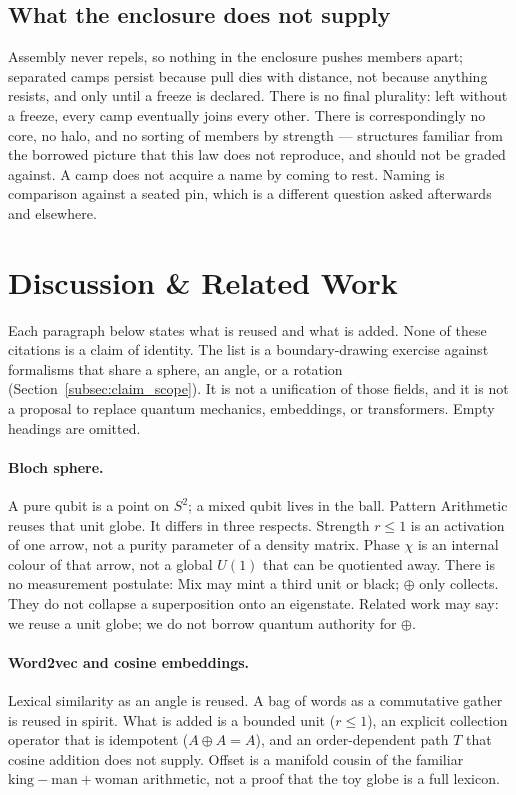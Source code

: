 \documentclass[12pt, a4paper]{article}
\begin{document}
\subsection{What the enclosure does not supply}
\label{subsec:enclosure_open}
Assembly never repels, so nothing in the enclosure pushes members
apart; separated camps persist because pull dies with distance, not
because anything resists, and only until a freeze is declared. There
is no final plurality: left without a freeze, every camp eventually
joins every other. There is correspondingly no core, no halo,
and no sorting of members by strength --- structures familiar from
the borrowed picture that this law does not reproduce, and should not
be graded against. A camp does not acquire a name by coming to rest.
Naming is comparison against a seated pin, which is a different
question asked afterwards and elsewhere.


\section{Discussion \& Related Work}
\label{sec:related}

Each paragraph below states what is reused and what is added. None of
these citations is a claim of identity. The list is a
boundary-drawing exercise against formalisms that share a sphere, an
angle, or a rotation
(Section~\ref{subsec:claim_scope}). It is not a unification of those
fields, and it is not a proposal to replace quantum mechanics,
embeddings, or transformers. Empty headings are omitted.

\paragraph{Bloch sphere.}
A pure qubit is a point on $S^2$; a mixed qubit lives in the ball.
Pattern Arithmetic reuses that unit globe. It differs in three
respects. Strength $r\le 1$ is an activation of one arrow, not a purity
parameter of a density matrix. Phase $\chi$ is an internal colour of
that arrow, not a global $U(1)$ that can be quotiented away. There is
no measurement postulate: Mix may mint a third unit or black; $\oplus$
only collects. They do not collapse a superposition onto an eigenstate. Related work
may say: we reuse a unit globe; we do not borrow quantum authority for
$\oplus$.

\paragraph{Word2vec and cosine embeddings.}
Lexical similarity as an angle is reused. A bag of words as a
commutative gather is reused in spirit. What is added is a bounded unit
($r\le 1$), an explicit collection operator that is idempotent
($A\oplus A=A$), and an order-dependent path $T$ that cosine addition
does not supply. Offset is a manifold cousin of the familiar
$\mathrm{king}-\mathrm{man}+\mathrm{woman}$ arithmetic, not a proof
that the toy globe is a full lexicon.
\end{document}
